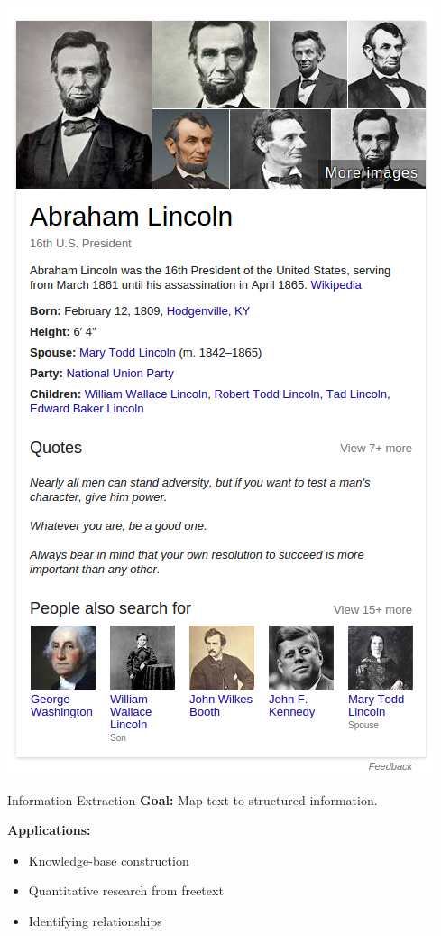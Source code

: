 \documentclass{beamer}
\begin{document}
\begin{frame}
  \begin{center}
    \includegraphics[height=\textheight]{abelincoln}
  \end{center}
\end{frame}

\begin{frame}{Information Extraction}
  \textbf{Goal:} Map text to structured information.
  \air 

  \textbf{Applications:} 
  \begin{itemize}
  \item Knowledge-base construction
    \air 
  \item Quantitative research from freetext
    \air 
  \item Identifying relationships 
  \end{itemize}
\end{frame}
\end{document}
